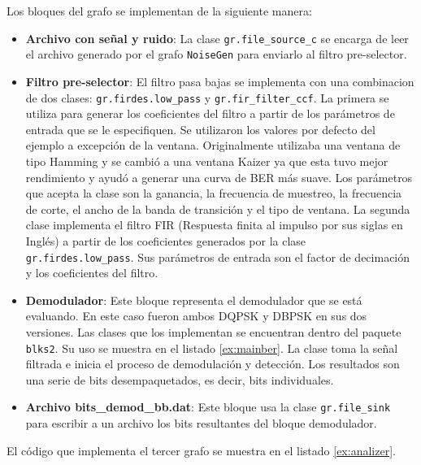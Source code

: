 Los bloques del grafo se implementan de la siguiente manera:

\begin{itemize}
  \item \textbf{Archivo con se\~nal y ruido}: La clase \verb|gr.file_source_c| se encarga de leer el
  archivo generado por el grafo \verb|NoiseGen| para enviarlo al filtro pre-selector.
  \item \textbf{Filtro pre-selector}: El filtro pasa bajas se implementa con una combinacion de dos
  clases: \verb|gr.firdes.low_pass| y \verb|gr.fir_filter_ccf|. La primera se utiliza para generar
  los coeficientes del filtro a partir de los par\'ametros de entrada que se le especifiquen. Se
  utilizaron los valores por defecto del ejemplo a excepci\'on de la ventana. Originalmente utilizaba
  una ventana de tipo Hamming y se cambi\'o a una ventana Kaizer ya que esta tuvo mejor rendimiento y
  ayud\'o a generar una curva de BER m\'as suave. Los par\'ametros que acepta la clase son la
  ganancia, la frecuencia de muestreo, la frecuencia de corte, el ancho de la banda de transici\'on
  y el tipo de ventana. La segunda clase implementa el filtro FIR (Respuesta finita al impulso por sus siglas en Ingl\'es) a
  partir de los coeficientes generados por la clase \verb|gr.firdes.low_pass|. Sus par\'ametros de entrada son el factor de
  decimaci\'on y los coeficientes del filtro.
  \item \textbf{Demodulador}: Este bloque representa el demodulador que se est\'a evaluando. En este
  caso fueron ambos DQPSK y DBPSK en sus dos versiones. Las clases que los implementan se encuentran
  dentro del paquete \verb|blks2|. Su uso se muestra en el listado \ref{ex:mainber}. La clase toma
  la se\~nal filtrada e inicia el proceso de demodulaci\'on y detecci\'on. Los resultados son una serie de bits
  desempaquetados, es decir, bits individuales.
  \item \textbf{Archivo bits\_demod\_bb.dat}: Este bloque usa la clase \verb|gr.file_sink| para
  escribir a un archivo los bits resultantes del bloque demodulador.
\end{itemize}

El c\'odigo que implementa el tercer grafo se muestra en el listado \ref{ex:analizer}.

